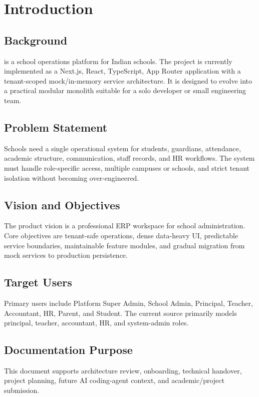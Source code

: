 \chapter{Introduction}
\section{Background}
\ProjectName{} is a school operations platform for Indian schools. The project is currently implemented as a Next.js, React, TypeScript, App Router application with a tenant-scoped mock/in-memory service architecture. It is designed to evolve into a practical modular monolith suitable for a solo developer or small engineering team.

\section{Problem Statement}
Schools need a single operational system for students, guardians, attendance, academic structure, communication, staff records, and HR workflows. The system must handle role-specific access, multiple campuses or schools, and strict tenant isolation without becoming over-engineered.

\section{Vision and Objectives}
The product vision is a professional ERP workspace for school administration. Core objectives are tenant-safe operations, dense data-heavy UI, predictable service boundaries, maintainable feature modules, and gradual migration from mock services to production persistence.

\section{Target Users}
Primary users include Platform Super Admin, School Admin, Principal, Teacher, Accountant, HR, Parent, and Student. The current source primarily models principal, teacher, accountant, HR, and system-admin roles.

\section{Documentation Purpose}
This document supports architecture review, onboarding, technical handover, project planning, future AI coding-agent context, and academic/project submission.
